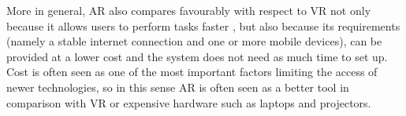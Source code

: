 More in general, AR also compares favourably with respect to \gls{VR} not only because it allows users to perform tasks faster \citep{7833028}, but also because its requirements (namely a stable internet connection and one or more mobile devices), can be provided at a lower cost and the system does not need as much time to set up. Cost is often seen as one of the most important factors limiting the access of newer technologies, so in this sense AR is often seen as a better tool in comparison with VR or expensive hardware such as laptops and projectors.
